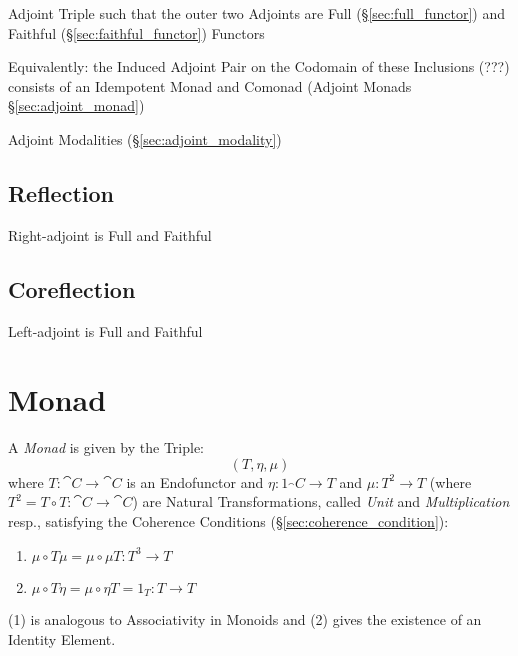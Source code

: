 Adjoint Triple such that the outer two Adjoints are Full
(\S\ref{sec:full_functor}) and Faithful (\S\ref{sec:faithful_functor})
Functors

Equivalently: the Induced Adjoint Pair on the Codomain of these
Inclusions (???) consists of an Idempotent Monad and Comonad (Adjoint
Monads \S\ref{sec:adjoint_monad})

Adjoint Modalities (\S\ref{sec:adjoint_modality})



\subsection{Reflection}\label{sec:reflection_adjunction}

\cite{winskel-nielsen93}

Right-adjoint is Full and Faithful



\subsection{Coreflection}\label{sec:coreflection_adjunction}

\cite{winskel-nielsen93}

Left-adjoint is Full and Faithful



\section{Monad}\label{sec:monad}

A \emph{Monad} is given by the Triple:
\[
  (T, \eta, \mu)
\]
where $T : \cat{C} \rightarrow \cat{C}$ is an Endofunctor and $\eta :
1_\cat{C} \rightarrow T$ and $\mu : T^2 \rightarrow T$ (where $T^2 = T
\circ T : \cat{C} \rightarrow \cat{C}$) are Natural Transformations,
called \emph{Unit} and \emph{Multiplication} resp., satisfying the
Coherence Conditions (\S\ref{sec:coherence_condition}):
\begin{enumerate}
  \item $\mu \circ T\mu = \mu \circ \mu T : T^3 \rightarrow T$
  \item $\mu \circ T\eta = \mu \circ \eta T = 1_T : T \rightarrow T$
\end{enumerate}
(1) is analogous to Associativity in Monoids and (2) gives the
existence of an Identity Element.

